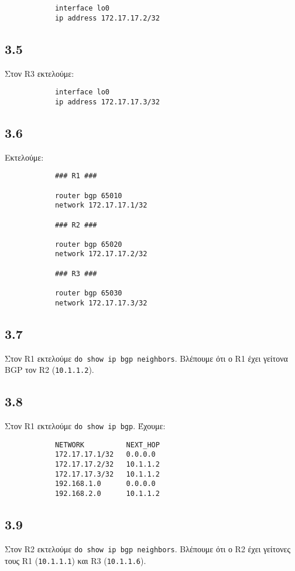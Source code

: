\documentclass[a4paper, 12pt]{article}
\begin{document}
		\begin{verbatim}
			interface lo0
			ip address 172.17.17.2/32
		\end{verbatim}

	\subsection*{3.5}
		Στον R3 εκτελούμε:
		
		\begin{verbatim}
			interface lo0
			ip address 172.17.17.3/32
		\end{verbatim}

	\subsection*{3.6}
		Εκτελούμε:
		
		\begin{verbatim}
			### R1 ###
			
			router bgp 65010
			network 172.17.17.1/32
			
			### R2 ###
			
			router bgp 65020
			network 172.17.17.2/32
			
			### R3 ###
			
			router bgp 65030
			network 172.17.17.3/32
		\end{verbatim}

	\subsection*{3.7}
		Στον R1 εκτελούμε \verb|do show ip bgp neighbors|. Βλέπουμε ότι ο R1 έχει γείτονα BGP τον R2 (\verb|10.1.1.2|).

	\subsection*{3.8}
		Στον R1 εκτελούμε \verb|do show ip bgp|. Έχουμε:
		
		\begin{verbatim}
			NETWORK          NEXT_HOP
			172.17.17.1/32   0.0.0.0
			172.17.17.2/32   10.1.1.2
			172.17.17.3/32   10.1.1.2
			192.168.1.0      0.0.0.0
			192.168.2.0      10.1.1.2
		\end{verbatim}

	\subsection*{3.9}
		Στον R2 εκτελούμε \verb|do show ip bgp neighbors|. Βλέπουμε ότι ο R2 έχει γείτονες τους R1 (\verb|10.1.1.1|) και R3 (\verb|10.1.1.6|).
\end{document}
